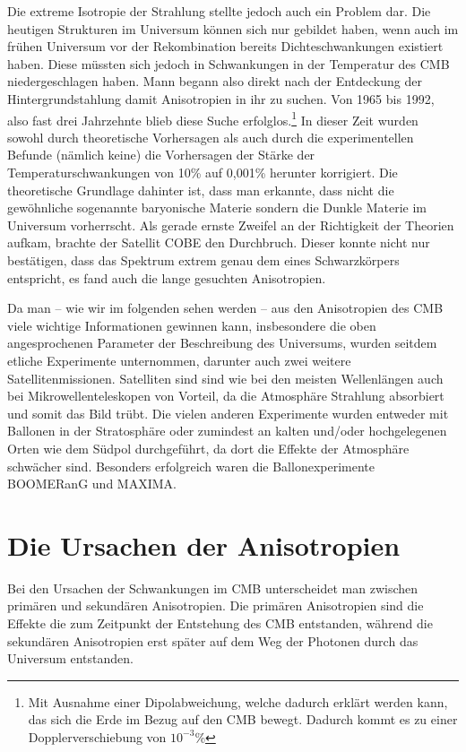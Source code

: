 \documentclass[10pt,a4paper]{article}
\begin{document}
Die extreme Isotropie der Strahlung stellte jedoch auch ein Problem dar. Die heutigen Strukturen im Universum können sich nur gebildet haben, wenn auch im frühen Universum vor der Rekombination bereits Dichteschwankungen existiert haben. Diese müssten sich jedoch in Schwankungen in der Temperatur des CMB niedergeschlagen haben. Mann begann also direkt nach der Entdeckung der Hintergrundstahlung damit Anisotropien in ihr zu suchen. Von 1965 bis 1992, also fast drei Jahrzehnte blieb diese Suche erfolglos.\footnote{Mit Ausnahme einer Dipolabweichung, welche dadurch erklärt werden kann, das sich die Erde im Bezug auf den CMB bewegt. Dadurch kommt es zu einer Dopplerverschiebung von $10^{-3}$\%} %
In dieser Zeit wurden sowohl durch theoretische Vorhersagen als auch durch die experimentellen Befunde (nämlich keine) die Vorhersagen der Stärke der Temperaturschwankungen von 10\% auf 0,001\%  herunter korrigiert.
Die theoretische Grundlage dahinter ist, dass man erkannte, dass nicht die gewöhnliche sogenannte baryonische Materie sondern die Dunkle Materie im Universum vorherrscht.
Als gerade ernste Zweifel an der Richtigkeit der Theorien aufkam, brachte der Satellit COBE den Durchbruch. Dieser konnte nicht nur bestätigen, dass das Spektrum extrem genau dem eines Schwarzkörpers entspricht, %
es fand auch die lange gesuchten Anisotropien.

Da man -- wie wir im folgenden sehen werden -- aus den Anisotropien des CMB viele wichtige Informationen gewinnen kann, insbesondere die oben angesprochenen Parameter der Beschreibung des Universums, wurden seitdem etliche Experimente unternommen, darunter auch zwei weitere Satellitenmissionen. Satelliten sind sind wie bei den meisten Wellenlängen auch bei Mikrowellenteleskopen von Vorteil, da die Atmosphäre Strahlung absorbiert und somit das Bild trübt. Die vielen anderen Experimente wurden entweder mit Ballonen in der Stratosphäre oder zumindest an kalten und/oder hochgelegenen Orten wie dem Südpol durchgeführt, da dort die Effekte der Atmosphäre schwächer sind.
Besonders erfolgreich waren die Ballonexperimente BOOMERanG und MAXIMA.

\section{Die Ursachen der Anisotropien}
Bei den Ursachen der Schwankungen im CMB unterscheidet man zwischen primären und sekundären Anisotropien. Die primären Anisotropien sind die Effekte die zum Zeitpunkt der Entstehung des CMB entstanden, während die sekundären Anisotropien erst später auf dem Weg der Photonen durch das Universum entstanden.
\end{document}
